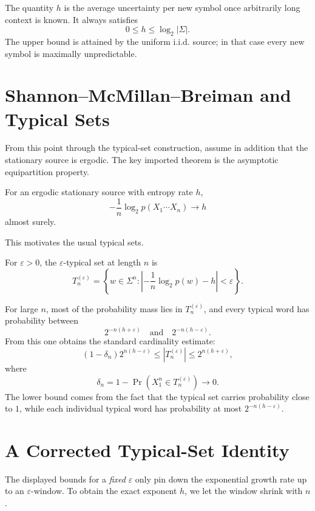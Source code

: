 The quantity $h$ is the average uncertainty per new symbol once arbitrarily long context is known. It always satisfies
\[
  0 \le h \le \log_2 |\Sigma|.
\]
The upper bound is attained by the uniform i.i.d. source; in that case every new symbol is maximally unpredictable.

\section{Shannon--McMillan--Breiman and Typical Sets}

From this point through the typical-set construction, assume in addition that the stationary source is ergodic. The key imported theorem is the asymptotic equipartition property.

\begin{theorem}
For an ergodic stationary source with entropy rate $h$,
\[
  -\frac{1}{n}\log_2 p(X_1\cdots X_n) \to h
\]
almost surely.
\end{theorem}

This motivates the usual typical sets.

\begin{definition}
For $\varepsilon > 0$, the $\varepsilon$-typical set at length $n$ is
\[
  T_n^{(\varepsilon)} = \left\{w \in \Sigma^n : \left| -\frac{1}{n}\log_2 p(w) - h \right| < \varepsilon \right\}.
\]
\end{definition}

For large $n$, most of the probability mass lies in $T_n^{(\varepsilon)}$, and every typical word has probability between
\[
  2^{-n(h+\varepsilon)} \quad\text{and}\quad 2^{-n(h-\varepsilon)}.
\]
From this one obtains the standard cardinality estimate:
\[
  (1-\delta_n)2^{n(h-\varepsilon)} \le |T_n^{(\varepsilon)}| \le 2^{n(h+\varepsilon)},
\]
where
\[
  \delta_n = 1 - \Pr(X_1^n \in T_n^{(\varepsilon)}) \to 0.
\]
The lower bound comes from the fact that the typical set carries probability close to $1$, while each individual typical word has probability at most $2^{-n(h-\varepsilon)}$.

\section{A Corrected Typical-Set Identity}

The displayed bounds for a \emph{fixed} $\varepsilon$ only pin down the exponential growth rate up to an $\varepsilon$-window. To obtain the exact exponent $h$, we let the window shrink with $n$.

